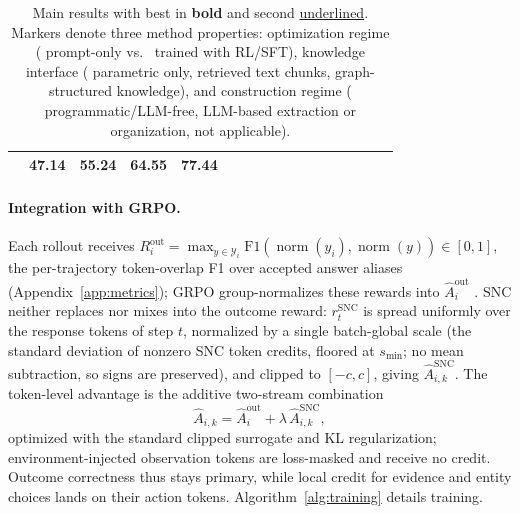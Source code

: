 \documentclass[letterpaper]{article} %
\begin{document}
\begin{table}[t]
\begin{tabular}{@{}l *{16}{c}@{}}
& \textbf{47.14} & \textbf{55.24} & \textbf{64.55} & \textbf{77.44} \\
\bottomrule
\end{tabular}
\small
\caption{Main results with best in \textbf{bold} and second \underline{underlined}.
Markers denote three method properties: optimization regime (\PromptOnlyMarker{} prompt-only vs.\ \TrainedMarker{} trained with RL/SFT), knowledge interface (\NoKnowledgeMarker{} parametric only, \ChunkKnowledgeMarker{} retrieved text chunks, \GraphKnowledgeMarker{} graph-structured knowledge), and construction regime (\LLMFreeMarker{} programmatic/LLM-free, \LLMBasedMarker{} LLM-based extraction or organization, \NoConstructionMarker{} not applicable).}
\label{tab:main}
\end{table}

\paragraph{Integration with GRPO.}
Each rollout receives $R_i^{\mathrm{out}}=\max_{y\in\mathcal{Y}_i}\mathrm{F1}(\operatorname{norm}(\hat y_i),\operatorname{norm}(y))\in[0,1]$, the per-trajectory token-overlap F1 over accepted answer aliases (Appendix~\ref{app:metrics}); GRPO group-normalizes these rewards into $\hat A_i^{\mathrm{out}}$ \citep{shao2024deepseekmath}. SNC neither replaces nor mixes into the outcome reward: $r_t^{\mathrm{SNC}}$ is spread uniformly over the response tokens of step $t$, normalized by a single batch-global scale (the standard deviation of nonzero SNC token credits, floored at $s_{\min}$; no mean subtraction, so signs are preserved), and clipped to $[-c,c]$, giving $\hat A_{i,k}^{\mathrm{SNC}}$. The token-level advantage is the additive two-stream combination
\begin{equation}
\hat A_{i,k}=\hat A_i^{\mathrm{out}}+\lambda\,\hat A_{i,k}^{\mathrm{SNC}},
\label{eq:combine}
\end{equation}
optimized with the standard clipped surrogate and KL regularization; environment-injected observation tokens are loss-masked and receive no credit. Outcome correctness thus stays primary, while local credit for evidence and entity choices lands on their action tokens. Algorithm~\ref{alg:training} details training.
\end{document}
